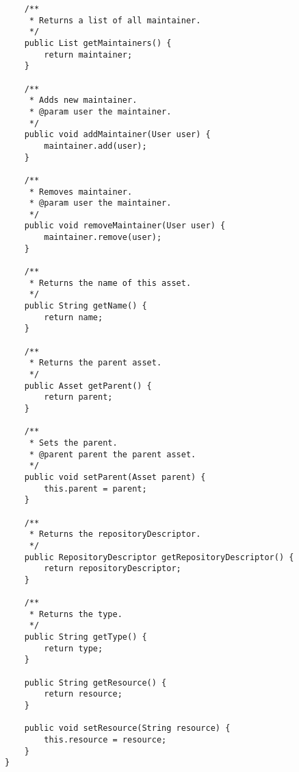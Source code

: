 \begin{verbatim}
	/**
	 * Returns a list of all maintainer.
	 */
	public List getMaintainers() {
		return maintainer;
	}
	
	/**
	 * Adds new maintainer.
	 * @param user the maintainer.
	 */
	public void addMaintainer(User user) {
		maintainer.add(user);
	}
	
	/**
	 * Removes maintainer.
	 * @param user the maintainer.
	 */
	public void removeMaintainer(User user) {
		maintainer.remove(user);
	}
	
	/**
	 * Returns the name of this asset.
	 */
	public String getName() {
		return name;
	}
	
	/**
	 * Returns the parent asset.
	 */
	public Asset getParent() {
		return parent;
	}
	
	/**
	 * Sets the parent.
	 * @parent parent the parent asset.
	 */
	public void setParent(Asset parent) {
		this.parent = parent;
	}
	
	/**
	 * Returns the repositoryDescriptor.
	 */
	public RepositoryDescriptor getRepositoryDescriptor() {
		return repositoryDescriptor;
	}
	
	/**
	 * Returns the type.
	 */
	public String getType() {
		return type;
	}
	
    public String getResource() {
        return resource;
    }
    
    public void setResource(String resource) {
        this.resource = resource;
    }
}
\end{verbatim}
